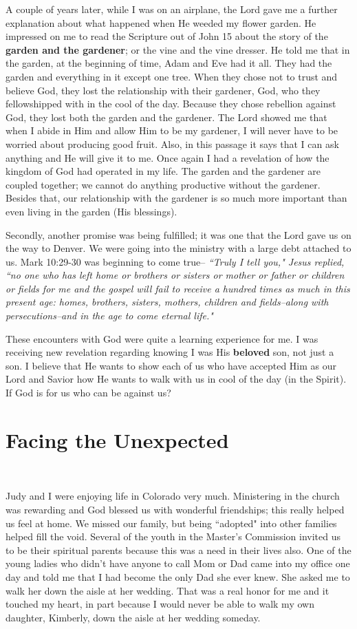 \documentclass[oneside,12pt]{book}
\begin{document}
A couple of years later, while I was on an airplane, the Lord gave me a further explanation about what happened when He weeded my flower garden. He impressed on me to read the Scripture out of John 15 about the story of the \textbf{garden and the gardener}; or the vine and the vine dresser. He told me that in the garden, at the beginning of time, Adam and Eve had it all. They had the garden and everything in it except one tree. When they chose not to trust and believe God, they lost the relationship with their gardener, God, who they fellowshipped with in the cool of the day. Because they chose rebellion against God, they lost both the garden and the gardener. The Lord showed me that when I abide in Him and allow Him to be my gardener, I will never have to be worried about producing good fruit. Also, in this passage it says that I can ask anything and He will give it to me. Once again I had a revelation of how the kingdom of God had operated in my life. The garden and the gardener are coupled together; we cannot do anything productive without the gardener. Besides that, our relationship with the gardener is so much more important than even  living in the garden (His blessings).

Secondly, another promise was being fulfilled; it was one that the Lord gave us on the way to Denver. We were going into the ministry with a large debt attached to us. Mark 10:29-30 was beginning to come true-- \textit{``Truly I tell you," Jesus replied, ``no one who has left home or brothers or sisters or mother or father or children or fields for me and the gospel will fail to receive a hundred times as much in this present age: homes, brothers, sisters, mothers, children and fields--along with persecutions--and in the age to come eternal life."}

These encounters with God were quite a learning experience for me. I was receiving new revelation regarding knowing I was His \textbf{beloved} son, not just a son. I believe that He wants to show each of us who have accepted Him as our Lord and Savior how He wants to walk with us in cool of the day (in the Spirit). If God is for us who can be against us?


\chapter{Facing the Unexpected}
\

Judy and I were enjoying life in Colorado very much. Ministering in the church was rewarding and God blessed us with wonderful friendships; this really helped us feel at home. We missed our family, but being ``adopted" into other families helped fill the void. Several of the youth in the Master's Commission invited us to be their spiritual parents because this was a need in their lives also. One of the young ladies who didn't have anyone to call Mom or Dad came into my office one day and told me that I had become the only Dad she ever knew. She asked me to walk her down the aisle at her wedding. That was a real honor for me and it touched my heart, in part because I would never be able to walk my own daughter, Kimberly, down the aisle at her wedding someday.
\end{document}
